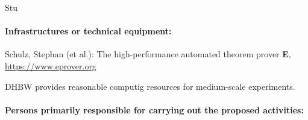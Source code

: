 \begin{sitedescription}{Stu}
\paragraph*{Infrastructures or technical equipment:}

\begin{compactitem}
\item Schulz, Stephan (et al.): The high-performance automated theorem
  prover \textbf{E}, \url{https://www.eprover.org}
\item DHBW provides reasonable computig resources for medium-scale
  experiments.
\end{compactitem}




\paragraph*{Persons primarily responsible for carrying out the proposed activities:}


\end{sitedescription}
